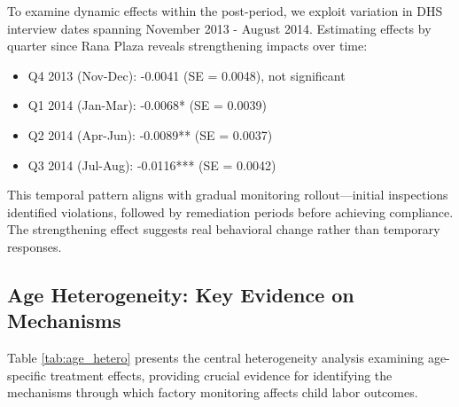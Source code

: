 \documentclass[12pt]{article}
\begin{document}
To examine dynamic effects within the post-period, we exploit variation in DHS interview dates spanning November 2013 - August 2014. Estimating effects by quarter since Rana Plaza reveals strengthening impacts over time:

\begin{itemize}
\item Q4 2013 (Nov-Dec): -0.0041 (SE = 0.0048), not significant
\item Q1 2014 (Jan-Mar): -0.0068* (SE = 0.0039)
\item Q2 2014 (Apr-Jun): -0.0089** (SE = 0.0037)
\item Q3 2014 (Jul-Aug): -0.0116*** (SE = 0.0042)
\end{itemize}

This temporal pattern aligns with gradual monitoring rollout—initial inspections identified violations, followed by remediation periods before achieving compliance. The strengthening effect suggests real behavioral change rather than temporary responses.

\subsection{Age Heterogeneity: Key Evidence on Mechanisms}

Table \ref{tab:age_hetero} presents the central heterogeneity analysis examining age-specific treatment effects, providing crucial evidence for identifying the mechanisms through which factory monitoring affects child labor outcomes.
\end{document}
